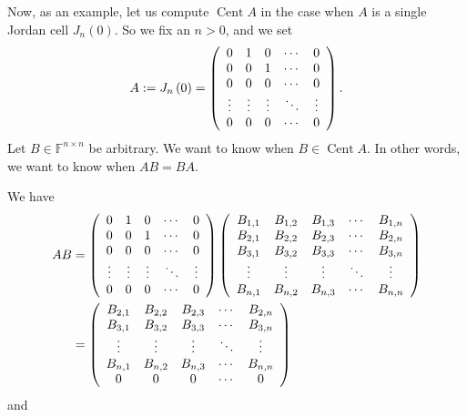 \documentclass[numbers=enddot,12pt,final,onecolumn,notitlepage]{scrartcl}%
\numberwithin{exer}{subsection}
\theoremstyle{definition}
\begin{document}
Now, as an example, let us compute $\operatorname*{Cent}A$ in the case when
$A$ is a single Jordan cell $J_{n}\left(  0\right)  $. So we fix an $n>0$, and
we set%
\[
A:=J_{n}\left(  0\right)  =\left(
\begin{array}
[c]{ccccc}%
0 & 1 & 0 & \cdots & 0\\
0 & 0 & 1 & \cdots & 0\\
0 & 0 & 0 & \cdots & 0\\
\vdots & \vdots & \vdots & \ddots & \vdots\\
0 & 0 & 0 & \cdots & 0
\end{array}
\right)  .
\]
Let $B\in\mathbb{F}^{n\times n}$ be arbitrary. We want to know when
$B\in\operatorname*{Cent}A$. In other words, we want to know when $AB=BA$.

We have
\begin{align*}
AB  &  =\left(
\begin{array}
[c]{ccccc}%
0 & 1 & 0 & \cdots & 0\\
0 & 0 & 1 & \cdots & 0\\
0 & 0 & 0 & \cdots & 0\\
\vdots & \vdots & \vdots & \ddots & \vdots\\
0 & 0 & 0 & \cdots & 0
\end{array}
\right)  \left(
\begin{array}
[c]{ccccc}%
B_{1,1} & B_{1,2} & B_{1,3} & \cdots & B_{1,n}\\
B_{2,1} & B_{2,2} & B_{2,3} & \cdots & B_{2,n}\\
B_{3,1} & B_{3,2} & B_{3,3} & \cdots & B_{3,n}\\
\vdots & \vdots & \vdots & \ddots & \vdots\\
B_{n,1} & B_{n,2} & B_{n,3} & \cdots & B_{n,n}%
\end{array}
\right) \\
&  =\left(
\begin{array}
[c]{ccccc}%
B_{2,1} & B_{2,2} & B_{2,3} & \cdots & B_{2,n}\\
B_{3,1} & B_{3,2} & B_{3,3} & \cdots & B_{3,n}\\
\vdots & \vdots & \vdots & \ddots & \vdots\\
B_{n,1} & B_{n,2} & B_{n,3} & \cdots & B_{n,n}\\
0 & 0 & 0 & \cdots & 0
\end{array}
\right)
\end{align*}
and%
\end{document}
